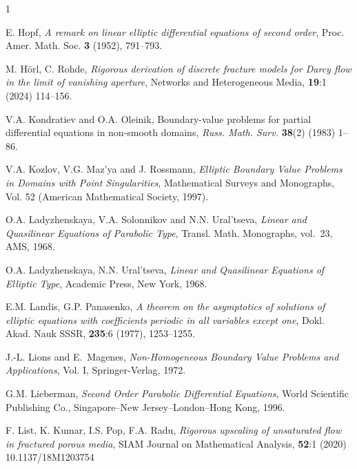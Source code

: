 \documentclass[reqno]{amsart}            %
\numberwithin{equation}{section}
\begin{document}
\begin{thebibliography}{1}
		
		E. Hopf, \textit{A remark on linear elliptic differential equations of second order}, Proc. Amer. Math. Soc.
		\textbf{3} (1952), 791–793.
		
		
		
		M. H\"orl, C. Rohde, \textit{Rigorous derivation of discrete fracture models for Darcy flow in the limit of vanishing aperture},
		Networks and Heterogeneous Media, \textbf{19}:1 (2024) 114–156.
		
		
		V.A. Kondratiev and O.A. Oleinik, Boundary-value problems for partial differential equations in non-smooth domains,
		\textit{Russ. Math. Surv.} \textbf{38}(2) (1983) 1--86.
		
		V.A. Kozlov, V.G. Maz'ya and J. Rossmann, \textit{Elliptic Boundary Value Problems in Domains with Point Singularities},
		Mathematical Surveys and Monographs, Vol. 52 (American Mathematical Society, 1997).
		
			
		{O.A. Ladyzhenskaya,  V.A. Solonnikov and N.N. Ural'tseva}, \textit{Linear and
			Quasilinear Equations of Parabolic Type},  Transl. Math.
		Monographs, vol.~23, AMS, 1968.
		
		{O.A. Ladyzhenskaya,   N.N. Ural'tseva}, \textit{Linear and
			Quasilinear Equations of Elliptic Type},  Academic Press, New York, 1968.
		
		E.M. Landis, G.P. Panasenko, \textit{A theorem on the
			asymptotics of solutions of elliptic equations with
			coefficients periodic in all variables except one},
		Dokl. Akad. Nauk SSSR, \textbf{235}:6 (1977), 1253–1255.
		
		J.-L. Lions and E.~Magenes,
		\textit{Non-Homogeneous Boundary Value Problems and Applications}, Vol. I,
		Springer-Verlag, 1972.
		
		G.M. Lieberman, \textit{Second Order Parabolic Differential Equations}, World Scientific Publishing Co., Singapore–New Jersey–London–Hong Kong, 1996.
		
		F. List, K. Kumar,  I.S. Pop, F.A. Radu, \textit{Rigorous upscaling of unsaturated flow in fractured porous media},
		SIAM Journal on Mathematical Analysis, \textbf{52}:1 (2020) 10.1137/18M1203754
		

\end{thebibliography}
\end{document}

